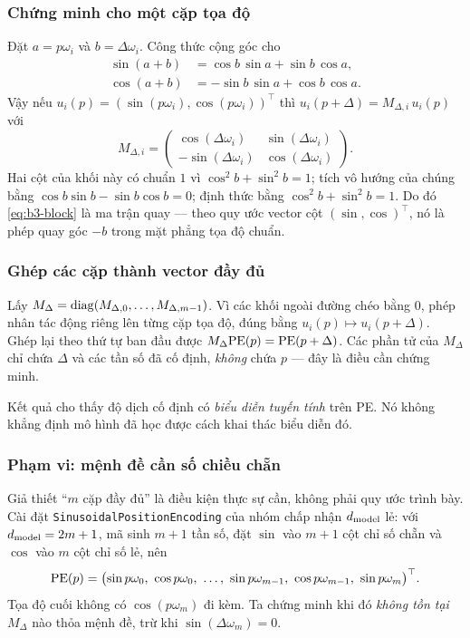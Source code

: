 \subsubsection{Chứng minh cho một cặp tọa độ}

Đặt $a=p\omega_i$ và $b=\Delta\omega_i$. Công thức cộng góc cho
\begin{align*}
  \sin(a+b)&=\cos b\,\sin a+\sin b\,\cos a,\\
  \cos(a+b)&=-\sin b\,\sin a+\cos b\,\cos a.
\end{align*}
Vậy nếu $u_i(p)=(\sin(p\omega_i),\cos(p\omega_i))^\top$ thì
$u_i(p+\Delta)=M_{\Delta,i}\,u_i(p)$ với
\begin{equation}
  M_{\Delta,i}=
    \begin{pmatrix}
      \cos(\Delta\omega_i)&\sin(\Delta\omega_i)\\
      -\sin(\Delta\omega_i)&\cos(\Delta\omega_i)
    \end{pmatrix}.
  \label{eq:b3-block}
\end{equation}
Hai cột của khối này có chuẩn $1$ vì $\cos^2 b+\sin^2 b=1$; tích vô hướng của chúng
bằng $\cos b\sin b-\sin b\cos b=0$; định thức bằng $\cos^2 b+\sin^2 b=1$. Do đó
\eqref{eq:b3-block} là ma trận quay --- theo quy ước vector cột $(\sin,\cos)^\top$,
nó là phép quay góc $-b$ trong mặt phẳng tọa độ chuẩn.

\subsubsection{Ghép các cặp thành vector đầy đủ}

Lấy $M_\Delta=\operatorname{diag}(M_{\Delta,0},\ldots,M_{\Delta,m-1})$. Vì các khối ngoài đường
chéo bằng $0$, phép nhân tác động riêng lên từng cặp tọa độ, đúng bằng
$u_i(p)\mapsto u_i(p+\Delta)$. Ghép lại theo thứ tự ban đầu được
$M_\Delta\mathrm{PE}(p)=\mathrm{PE}(p+\Delta)$. Các phần tử của $M_\Delta$ chỉ chứa $\Delta$ và
các tần số đã cố định, \emph{không} chứa $p$ --- đây là điều cần chứng minh.

Kết quả cho thấy độ dịch cố định có \emph{biểu diễn tuyến tính} trên PE. Nó không
khẳng định mô hình đã học được cách khai thác biểu diễn đó.

\subsubsection{Phạm vi: mệnh đề cần số chiều chẵn}
\label{sec:b3-odd}

Giả thiết ``$m$ cặp đầy đủ'' là điều kiện thực sự cần, không phải quy ước trình
bày. Cài đặt \texttt{SinusoidalPositionEncoding} của nhóm chấp nhận $d_{\mathrm{model}}$ lẻ:
với $d_{\mathrm{model}}=2m+1$, mã sinh $m+1$ tần số, đặt $\sin$ vào $m+1$ cột chỉ số chẵn và
$\cos$ vào $m$ cột chỉ số lẻ, nên
\[
  \mathrm{PE}(p)=\bigl(\sin p\omega_0,\ \cos p\omega_0,\ \ldots,\
                \sin p\omega_{m-1},\ \cos p\omega_{m-1},\
                \sin p\omega_m\bigr)^\top .
\]
Tọa độ cuối không có $\cos(p\omega_m)$ đi kèm. Ta chứng minh khi đó \emph{không tồn
tại} $M_\Delta$ nào thỏa mệnh đề, trừ khi $\sin(\Delta\omega_m)=0$.


